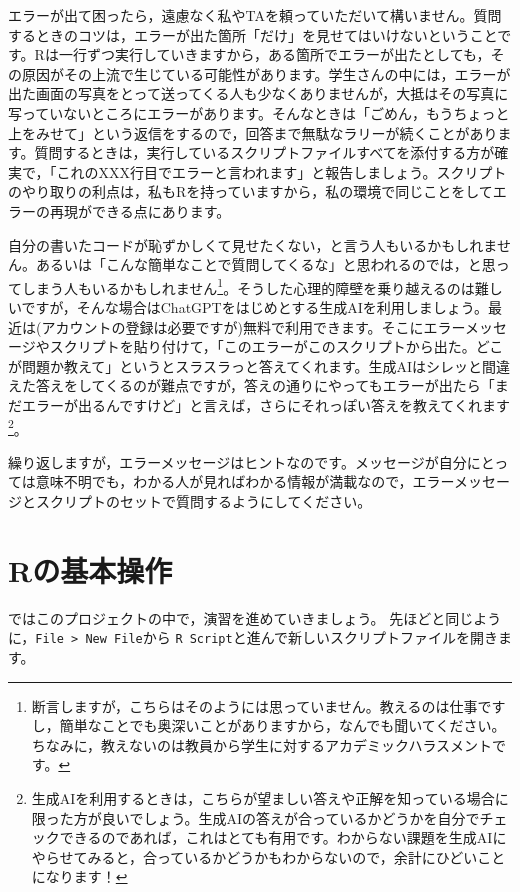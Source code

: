\documentclass{ltjsbook}
\begin{document}
エラーが出て困ったら，遠慮なく私やTAを頼っていただいて構いません。質問するときのコツは，エラーが出た箇所「だけ」を見せてはいけないということです。Rは一行ずつ実行していきますから，ある箇所でエラーが出たとしても，その原因がその上流で生じている可能性があります。学生さんの中には，エラーが出た画面の写真をとって送ってくる人も少なくありませんが，大抵はその写真に写っていないところにエラーがあります。そんなときは「ごめん，もうちょっと上をみせて」という返信をするので，回答まで無駄なラリーが続くことがあります。質問するときは，実行しているスクリプトファイルすべてを添付する方が確実で，「これのXXX行目でエラーと言われます」と報告しましょう。スクリプトのやり取りの利点は，私もRを持っていますから，私の環境で同じことをしてエラーの再現ができる点にあります。

自分の書いたコードが恥ずかしくて見せたくない，と言う人もいるかもしれません。あるいは「こんな簡単なことで質問してくるな」と思われるのでは，と思ってしまう人もいるかもしれません\footnote{断言しますが，こちらはそのようには思っていません。教えるのは仕事ですし，簡単なことでも奥深いことがありますから，なんでも聞いてください。ちなみに，教えないのは教員から学生に対するアカデミックハラスメントです。}。そうした心理的障壁を乗り越えるのは難しいですが，そんな場合はChatGPTをはじめとする生成AIを利用しましょう。最近は(アカウントの登録は必要ですが)無料で利用できます。そこにエラーメッセージやスクリプトを貼り付けて，「このエラーがこのスクリプトから出た。どこが問題か教えて」というとスラスラっと答えてくれます。生成AIはシレッと間違えた答えをしてくるのが難点ですが，答えの通りにやってもエラーが出たら「まだエラーが出るんですけど」と言えば，さらにそれっぽい答えを教えてくれます\footnote{生成AIを利用するときは，こちらが望ましい答えや正解を知っている場合に限った方が良いでしょう。生成AIの答えが合っているかどうかを自分でチェックできるのであれば，これはとても有用です。わからない課題を生成AIにやらせてみると，合っているかどうかもわからないので，余計にひどいことになります！}。

繰り返しますが，エラーメッセージはヒントなのです。メッセージが自分にとっては意味不明でも，わかる人が見ればわかる情報が満載なので，エラーメッセージとスクリプトのセットで質問するようにしてください。

\section{Rの基本操作}
ではこのプロジェクトの中で，演習を進めていきましょう。
先ほどと同じように，\verb|File > New File|から \verb|R Script|と進んで新しいスクリプトファイルを開きます。
\end{document}
